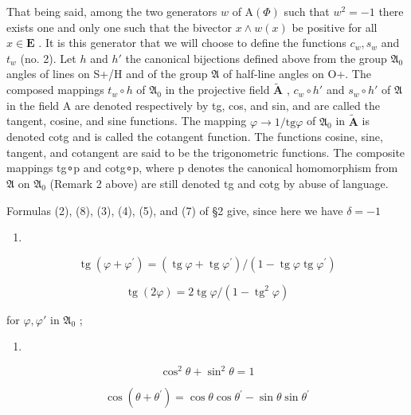 That being said, among the two generators \(w\) of \(\mathrm{A}(\Phi)\) such that \(w^{2} = -1\) there exists one and only one such that the bivector \(x \wedge w(x)\) be positive for all \(x\in\mathbf{E}\) . It is this generator that we will choose to define the functions \(c_{w}, s_{w}\) and \(t_{w}\) (no. 2). Let \(h\) and \(h'\) the canonical bijections defined above from the group \(\mathfrak{A}_{0}\) angles of lines on S+/H and of the group \(\mathfrak{A}\) of half-line angles on O+. The composed mappings \(t_{w}\circ h\) of \(\mathfrak{A}_{0}\) in the projective field \(\tilde{\mathbf{A}}\) , \(c_{w}\circ h'\) and \(s_{w}\circ h'\) of \(\mathfrak{A}\) in the field A are denoted respectively by tg, cos, and sin, and are called the tangent, cosine, and sine functions. The mapping \(\varphi\to1/\mathrm{tg}\varphi\) of \(\mathfrak{A}_{0}\) in \(\tilde{\mathbf{A}}\) is denoted cotg and is called the cotangent function. The functions cosine, sine, tangent, and cotangent are said to be the trigonometric functions. The composite mappings tg∘p and cotg∘p, where p denotes the canonical homomorphism from \(\mathfrak{A}\) on \(\mathfrak{A}_{0}\) (Remark 2 above) are still denoted tg and cotg by abuse of language.

Formulas (2), (8), (3), (4), (5), and (7) of §2 give, since here we have \(\delta = -1\)

\begin{enumerate}
\def\labelenumi{(\arabic{enumi})}
\setcounter{enumi}{10}
\tightlist
\item
\end{enumerate}

\[
\operatorname{tg} \left(\varphi + \varphi^ {\prime}\right) = (\operatorname{tg} \varphi + \operatorname{tg} \varphi^ {\prime}) / (1 - \operatorname{tg} \varphi \operatorname{tg} \varphi^ {\prime})\tag{12}
\]

\[
\operatorname{tg} (2 \varphi) = 2 \operatorname{tg} \varphi / (1 - \operatorname{tg} ^ {2} \varphi)
\]

for \(\varphi, \varphi'\) in \(\mathfrak{A}_0\) ;

\begin{enumerate}
\def\labelenumi{(\arabic{enumi})}
\setcounter{enumi}{12}
\tightlist
\item
\end{enumerate}

\[
\cos^ {2} \theta + \sin^ {2} \theta = 1\tag{14}
\]

\[
\cos (\theta + \theta^ {\prime}) = \cos \theta \cos \theta^ {\prime} - \sin \theta \sin \theta^ {\prime}\tag{15}
\]

